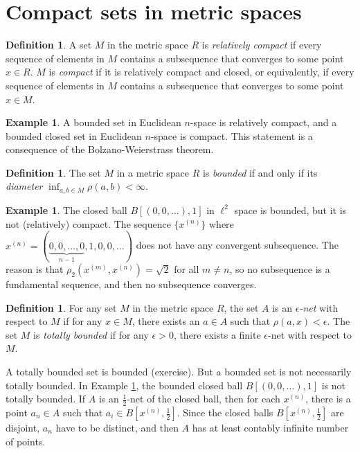 \documentclass[a4paper,12pt]{article}
\theoremstyle{definition}
\newtheorem{defn}[thm]{Definition}
\newtheorem{expl}[thm]{Example}
\theoremstyle{remark}
\begin{document}
\section{Compact sets in metric spaces}

\begin{defn}
  A set $M$ in the metric space $R$ is \emph{relatively compact} if every sequence of elements in $M$ contains a subsequence that converges to some point $x \in R$. $M$ is \emph{compact} if it is relatively compact and closed, or equivalently, if every sequence of elements in $M$ contains a subsequence that converges to some point $x \in M$.
\end{defn}

\begin{expl}
  A bounded set in Euclidean $n$-space is relatively compact, and a bounded closed set in Euclidean $n$-space is compact. This statement is a consequence of the Bolzano-Weierstrass theorem.
\end{expl}

\begin{defn}
  The set $M$ in a metric space $R$ is \emph{bounded} if and only if its \emph{diameter} $\inf_{a, b \in M} \rho(a, b) < \infty$.
\end{defn}

\begin{expl} \label{expl:closed_ball_in_l^2_not_compact}
  The closed ball $B[(0, 0, \dotsc), 1]$ in $\ell^2$ space is bounded, but it is not (relatively) compact. The sequence $\{ x^{(n)} \}$ where $x^{(n)} = (\underbrace{0, 0, \dotsc, 0}_{n - 1}, 1, 0, 0, \dotsc)$ does not have any convergent subsequence. The reason is that $\rho_2(x^{(m)}, x^{(n)}) = \sqrt{2}$ for all $m \neq n$, so no subsequence is a fundamental sequence, and then no subsequence converges.
\end{expl}

\begin{defn}
  For any set $M$ in the metric space $R$, the set $A$ is an \emph{$\epsilon$-net} with respect to $M$ if for any $x \in M$, there exists an $a \in A$ such that $\rho(a, x) < \epsilon$. The set $M$ is \emph{totally bounded} if for any $\epsilon > 0$, there exists a finite $\epsilon$-net with respect to $M$.
\end{defn}

A totally bounded set is bounded (exercise). But a bounded set is not necessarily totally bounded. In Example \ref{expl:closed_ball_in_l^2_not_compact}, the bounded closed ball $B[(0, 0, \dotsc), 1]$ is not totally bounded. If $A$ is an $\frac{1}{2}$-net of the closed ball, then for each $x^{(n)}$, there is a point $a_n \in A$ such that $a_i \in B[x^{(n)}, \frac{1}{2}]$. Since the closed balls $B[x^{(n)}, \frac{1}{2}]$ are disjoint, $a_n$ have to be distinct, and then $A$ has at least contably infinite number of points.
\end{document}
